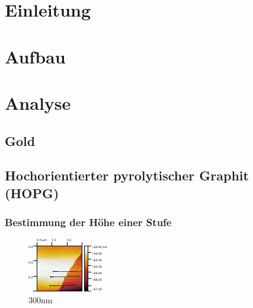 \tableofcontents
\newpage
\listoffigures

\listoftables

\skippage

\setcounter{page}{1}
\restoregeometry
\thispagestyle{fancy}


\section{Einleitung}


\section{Aufbau}


\section{Analyse}
\subsection{Gold}

\subsection{Hochorientierter pyrolytischer Graphit (HOPG)}
\subsubsection{Bestimmung der Höhe einer Stufe}

\begin{figure}[H]
\centering
\includegraphics[width=\textwidth]{../Gwyddion/HOPG/300nm.pdf}
\caption{300nm}
\label{300nm}
\end{figure}	

